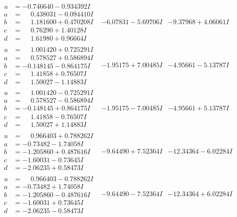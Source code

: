 \documentclass[1p]{elsarticle_modified}
\theoremstyle{definition}
\begin{document}
$$\begin{array}{c|c|c}
\begin{aligned}
u &= -0.746640 - 0.934392 I \\
a &= \phantom{-}0.438031 - 0.094410 I \\
b &= \phantom{-}1.181600 + 0.470208 I \\
c &= \phantom{-}0.76290 + 1.40128 I \\
d &= \phantom{-}1.61980 + 0.96664 I\end{aligned}
 & -6.07831 - 5.69706 I & -9.37968 + 4.06061 I \\ \hline\begin{aligned}
u &= \phantom{-}1.001420 + 0.725291 I \\
a &= \phantom{-}0.578527 + 0.586894 I \\
b &= -0.148145 - 0.864175 I \\
c &= \phantom{-}1.41858 + 0.76507 I \\
d &= \phantom{-}1.50027 - 1.14883 I\end{aligned}
 & -1.95175 + 7.00485 I & -4.95661 - 5.13787 I \\ \hline\begin{aligned}
u &= \phantom{-}1.001420 - 0.725291 I \\
a &= \phantom{-}0.578527 - 0.586894 I \\
b &= -0.148145 + 0.864175 I \\
c &= \phantom{-}1.41858 - 0.76507 I \\
d &= \phantom{-}1.50027 + 1.14883 I\end{aligned}
 & -1.95175 - 7.00485 I & -4.95661 + 5.13787 I \\ \hline\begin{aligned}
u &= \phantom{-}0.966403 + 0.788262 I \\
a &= -0.73482 - 1.74058 I \\
b &= -1.205860 + 0.487616 I \\
c &= -1.60031 - 0.73645 I \\
d &= -2.06235 + 0.58473 I\end{aligned}
 & -9.64490 + 7.52364 I & -12.34364 - 6.02284 I \\ \hline\begin{aligned}
u &= \phantom{-}0.966403 - 0.788262 I \\
a &= -0.73482 + 1.74058 I \\
b &= -1.205860 - 0.487616 I \\
c &= -1.60031 + 0.73645 I \\
d &= -2.06235 - 0.58473 I\end{aligned}
 & -9.64490 - 7.52364 I & -12.34364 + 6.02284 I\\

\end{array}$$
\end{document}
